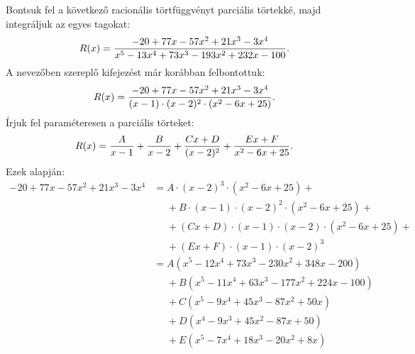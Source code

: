 \begin{example}
  Bontsuk fel a következő racionális törtfüggvényt parciális törtekké, majd
  integráljuk az egyes tagokat:
  \[
    R(x) = \frac{
      -20 + 77 x - 57 x^2 + 21 x^3 - 3 x^4
    }{
      x^5 - 13 x^4 + 73 x^3 - 193 x^2 + 232 x - 100
    }
    \text.
  \]
  A nevezőben szereplő kifejezést már korábban felbontottuk:
  \[
    R(x) = \frac{
      -20 + 77 x - 57 x^2 + 21 x^3 - 3 x^4
    }{
      (x - 1) \cdot (x - 2)^2 \cdot (x^2 - 6x + 25)
    }
    \text.
  \]
  Írjuk fel paraméteresen a parciális törteket:
  \[
    R(x)
    = \frac{A}{x - 1}
    + \frac{B}{x - 2}
    + \frac{Cx + D}{(x - 2)^2}
    + \frac{Ex + F}{x^2 - 6x + 25}
    \text.
  \]
  Ezek alapján:
  \begin{align*}
    -20 + 77 x - 57 x^2 + 21 x^3 - 3 x^4
     & = A \cdot (x - 2)^3 \cdot (x^2 - 6x + 25) +
    \\
     & \phantom= + B \cdot (x - 1) \cdot (x - 2)^2 \cdot (x^2 - 6x + 25) +
    \\
     & \phantom= + (Cx + D) \cdot (x - 1) \cdot (x - 2) \cdot (x^2 - 6x + 25) +
    \\
     & \phantom= + (Ex + F) \cdot (x - 1) \cdot (x - 2)^3
    \\[2mm]
     & = A (x^5 - 12 x^4 + 73 x^3 - 230 x^2 + 348 x - 200)
    \\
     & \phantom= + B (x^5 - 11 x^4 + 63 x^3 - 177 x^2 + 224 x - 100)
    \\
     & \phantom= + C (x^5 - 9 x^4 + 45 x^3 - 87 x^2 + 50 x)
    \\
     & \phantom= + D (x^4 - 9 x^3 + 45 x^2 - 87 x + 50)
    \\
     & \phantom= + E (x^5 - 7 x^4 + 18 x^3 - 20 x^2 + 8 x)
    \\

\end{align*}
\end{example}
